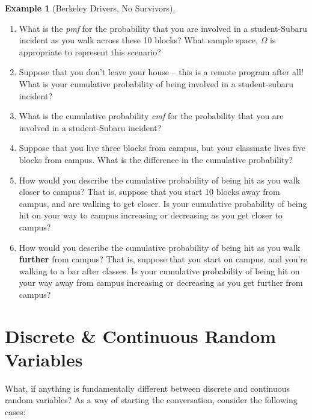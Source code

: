 \documentclass[
]{book}
\providecommand{\tightlist}{%
  \setlength{\itemsep}{0pt}\setlength{\parskip}{0pt}}
\theoremstyle{definition}
\theoremstyle{definition}
\newtheorem{example}{Example}[chapter]
\theoremstyle{definition}
\theoremstyle{definition}
\theoremstyle{remark}
\begin{document}
\begin{example}[Berkeley Drivers, No Survivors]
\begin{enumerate}
\def\labelenumi{\arabic{enumi}.}
\tightlist
\item
  What is the \emph{pmf} for the probability that you are involved in a student-Subaru incident as you walk across these 10 blocks? What sample space, \(\Omega\) is appropriate to represent this scenario?
\item
  Suppose that you don't leave your house -- this is a remote program after all! What is your cumulative probability of being involved in a student-subaru incident?\\
\item
  What is the cumulative probability \emph{cmf} for the probability that you are involved in a student-Subaru incident?
\item
  Suppose that you live three blocks from campus, but your classmate lives five blocks from campus. What is the difference in the cumulative probability?
\item
  How would you describe the cumulative probability of being hit as you walk closer to campus? That is, suppose that you start 10 blocks away from campus, and are walking to get closer. Is your cumulative probability of being hit on your way to campus increasing or decreasing as you get closer to campus?
\item
  How would you describe the cumulative probability of being hit as you walk \textbf{further} from campus? That is, suppose that you start on campus, and you're walking to a bar after classes. Is your cumulative probability of being hit on your way away from campus increasing or decreasing as you get further from campus?
\end{enumerate}

\end{example}

\hypertarget{discrete-continuous-random-variables}{%
\section{Discrete \& Continuous Random Variables}\label{discrete-continuous-random-variables}}

What, if anything is fundamentally different between discrete and continuous random variables? As a way of starting the conversation, consider the following cases:
\end{document}
